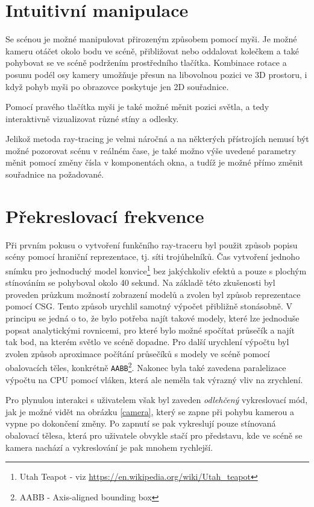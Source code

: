 \documentclass[12pt,a4paper,titlepage,final]{report}
\begin{document}
\section{Intuitivní manipulace}
Se scénou je možné manipulovat přirozeným způsobem pomocí myši. Je možné kameru otáčet okolo bodu ve scéně, přibližovat nebo oddalovat kolečkem a také pohybovat se ve scéně podržením prostředního tlačítka.
Kombinace rotace a posunu podél osy kamery umožňuje přesun na libovolnou pozici ve 3D prostoru, i když pohyb myši po obrazovce poskytuje jen 2D souřadnice. 

Pomocí pravého tlačítka myši je také možné měnit pozici světla, a tedy interaktivně vizualizovat různé stíny a odlesky.

Jelikož metoda ray-tracing je velmi náročná a na některých přístrojích nemusí být možné pozorovat scénu v reálném čase, je také možno výše uvedené parametry měnit pomocí změny čísla v komponentách okna, a tudíž je možné přímo změnit souřadnice na požadované.

\section{Překreslovací frekvence}
\label{sec:fps}

Při prvním pokusu o vytvoření funkčního ray-traceru byl použit způsob popisu scény pomocí hraniční reprezentace, tj. síti trojúhelníků. Čas vytvoření jednoho snímku pro jednoduchý model konvice\footnote{Utah Teapot - viz \url{https://en.wikipedia.org/wiki/Utah_teapot}} bez jakýchkoliv efektů a pouze s plochým stínováním se pohyboval okolo 40 sekund. Na základě této zkušenosti byl proveden průzkum možností zobrazení modelů a zvolen byl způsob reprezentace pomocí CSG. Tento způsob urychlil samotný výpočet přibližně stonásobně. V principu se jedná o to, že bylo potřeba najít takové modely, které lze jednoduše popsat analytickými rovnicemi, pro které bylo možné spočítat průsečík a najít tak bod, na kterém světlo ve scéně dopadne. Pro další urychlení výpočtu byl zvolen způsob aproximace počítání průsečíků s modely ve scéně pomocí obalovacích těles, konkrétně \texttt{AABB}\footnote{AABB - Axis-aligned bounding box}. Nakonec byla také zavedena paralelizace výpočtu na CPU pomocí vláken, která ale neměla tak výrazný vliv na zrychlení.

Pro plynulou interakci s uživatelem však byl zaveden \emph{odlehčený} vykreslovací mód, jak je možné vidět na obrázku \ref{camera}, který se zapne při pohybu kamerou a vypne po dokončení změny. Po zapnutí se pak vykreslují pouze stínovaná obalovací tělesa, která pro uživatele obvykle stačí pro představu, kde ve scéně se kamera nachází a vykreslování je pak mnohem rychlejší. 
\end{document}
